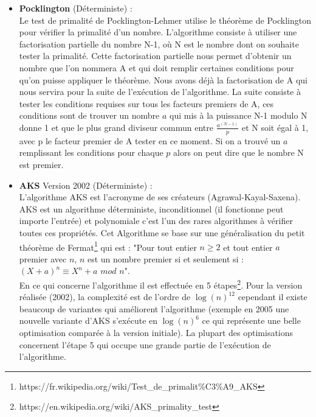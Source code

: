 \begin{itemize}
			\item \textbf{Pocklington} (Déterministe) :\\
			 Le test de primalité de Pocklington-Lehmer utilise le théorème de Pocklington pour vérifier la primalité d’un nombre.
L’algorithme consiste à utiliser une factorisation partielle du nombre N-1, où N est le nombre dont on souhaite tester la primalité. Cette factorisation partielle nous permet d’obtenir un nombre que l’on nommera A et qui doit remplir certaines conditions pour qu’on puisse appliquer le théorème.
Nous avons déjà la factorisation de A qui nous servira pour la suite de l'exécution de l’algorithme. 
La suite consiste à tester les conditions requises sur tous les facteurs premiers de A, ces conditions sont de trouver un nombre $a$ qui mis à la puissance N-1 modulo N donne 1 et que le plus grand diviseur commun entre {\Large$\frac{a^{(N-1)}}{p}$} et N soit égal à 1, avec p le facteur premier de A tester en ce moment. Si on a trouvé un $a$ remplissant les conditions pour chaque $p$ alors on peut dire que le nombre N est premier.\\

			\item \textbf{AKS} Version 2002 (Déterministe) :\\
			L'algorithme AKS est l’acronyme de ses créateurs (Agrawal-Kayal-Saxena). AKS est un algorithme déterministe, inconditionnel (il fonctionne peut importe l'entrée) et polynomiale c'est l'un des rares algorithmes à vérifier toutes ces propriétés. Cet Algorithme se base sur une généralisation du petit théorème de Fermat\footnote{https://fr.wikipedia.org/wiki/Test\_de\_primalit\%C3\%A9\_AKS} qui est : "Pour tout entier $n \geq 2$ et tout entier $a$ premier avec $n$, $n$ est un nombre premier si et seulement si : $(X + a)^n \equiv X^n + a$ $mod$ $n$".\\

En ce qui concerne l’algorithme il est effectuée en 5 étapes\href{AKS}\footnote{https://en.wikipedia.org/wiki/AKS\_primality\_test}.
Pour la version réalisée (2002), la complexité est de l'ordre de $\log(n)^{12}$ cependant il existe beaucoup de variantes qui améliorent l'algorithme (exemple en 2005 une nouvelle variante d'AKS s’exécute en $\log(n)^6$ ce qui représente une belle optimisation comparée à la version initiale). La plupart des optimisations concernent l'étape 5 qui occupe une grande partie de l'exécution de l'algorithme.\\
			

\end{itemize}
